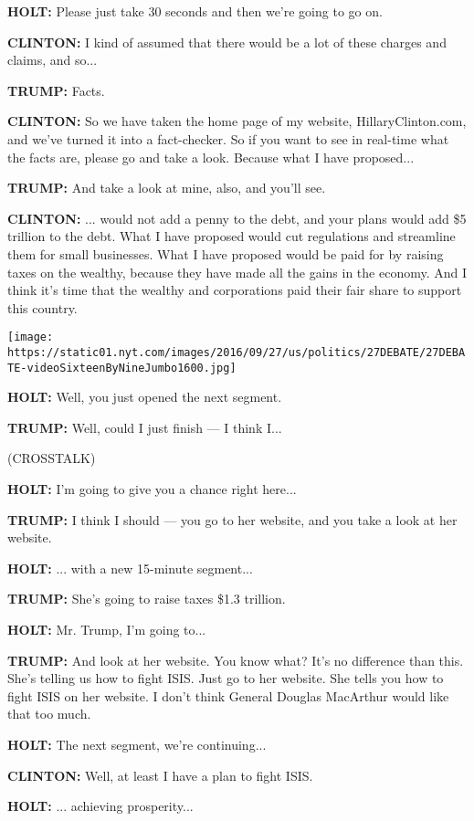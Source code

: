 \textbf{HOLT:} Please just take 30 seconds and then we're going to go
on.

\textbf{CLINTON:} I kind of assumed that there would be a lot of these
charges and claims, and so...

\textbf{TRUMP:} Facts.

\textbf{CLINTON:} So we have taken the home page of my website,
HillaryClinton.com, and we've turned it into a fact-checker. So if you
want to see in real-time what the facts are, please go and take a look.
Because what I have proposed...

\textbf{TRUMP:} And take a look at mine, also, and you'll see.

\textbf{CLINTON:} ... would not add a penny to the debt, and your plans
would add \$5 trillion to the debt. What I have proposed would cut
regulations and streamline them for small businesses. What I have
proposed would be paid for by raising taxes on the wealthy, because they
have made all the gains in the economy. And I think it's time that the
wealthy and corporations paid their fair share to support this country.

\texttt{[image: https://static01.nyt.com/images/2016/09/27/us/politics/27DEBATE/27DEBATE-videoSixteenByNineJumbo1600.jpg]}

\textbf{HOLT:} Well, you just opened the next segment.

\textbf{TRUMP:} Well, could I just finish --- I think I...

(CROSSTALK)

\textbf{HOLT:} I'm going to give you a chance right here...

\textbf{TRUMP:} I think I should --- you go to her website, and you take
a look at her website.

\textbf{HOLT:} ... with a new 15-minute segment...

\textbf{TRUMP:} She's going to raise taxes \$1.3 trillion.

\textbf{HOLT:} Mr. Trump, I'm going to...

\textbf{TRUMP:} And look at her website. You know what? It's no
difference than this. She's telling us how to fight ISIS. Just go to her
website. She tells you how to fight ISIS on her website. I don't think
General Douglas MacArthur would like that too much.

\textbf{HOLT:} The next segment, we're continuing...

\textbf{CLINTON:} Well, at least I have a plan to fight ISIS.

\textbf{HOLT:} ... achieving prosperity...

